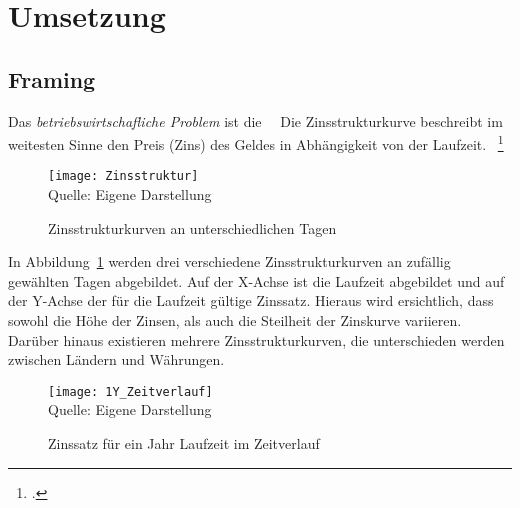 \newpage
\section{Umsetzung} \label{sec: Umsetzung}

\subsection{Framing} \label{sec: p_Framing}

Das \textit{betriebswirtschafliche Problem} ist die~~\grqq
Die Zinsstrukturkurve beschreibt im weitesten Sinne den Preis (Zins) des Geldes in Abhängigkeit von der Laufzeit.
~\footcite[\vglf][\pagef]{}
\begin{figure}[H]
    \caption{Zinsstrukturkurven an unterschiedlichen Tagen}\label{fig:Zinsstrukturkurven}
    \texttt{[image: Zinsstruktur]}
    \\
    Quelle: Eigene Darstellung
\end{figure}
In Abbildung~\ref{fig:Zinsstrukturkurven} werden drei verschiedene Zinsstrukturkurven an zufällig gewählten Tagen
abgebildet.
Auf der X-Achse ist die Laufzeit abgebildet und auf der Y-Achse der für die Laufzeit gültige Zinssatz.
Hieraus wird ersichtlich, dass sowohl die Höhe der Zinsen, als auch die Steilheit der Zinskurve variieren.
Darüber hinaus existieren mehrere Zinsstrukturkurven, die unterschieden werden zwischen Ländern und Währungen.
\begin{figure}[H]
    \caption{Zinssatz für ein Jahr Laufzeit im Zeitverlauf}\label{fig:1Y_Zeitverlauf}
    \texttt{[image: 1Y\_Zeitverlauf]}
    \\
    Quelle: Eigene Darstellung
\end{figure}


